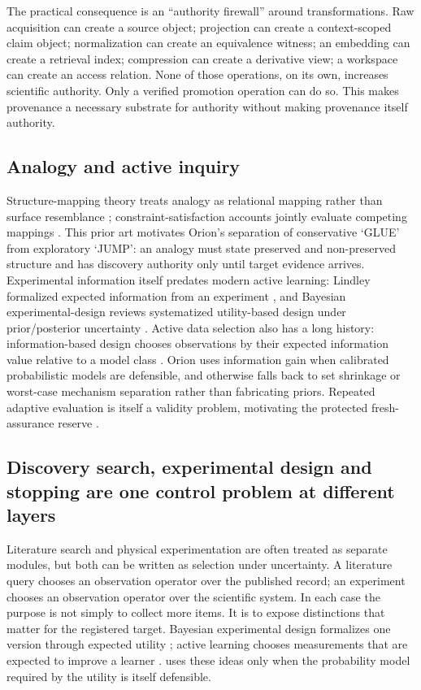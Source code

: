 The practical consequence is an ``authority firewall'' around transformations. Raw acquisition can create a source object; projection can create a context-scoped claim object; normalization can create an equivalence witness; an embedding can create a retrieval index; compression can create a derivative view; a workspace can create an access relation. None of those operations, on its own, increases scientific authority. Only a verified promotion operation can do so. This makes provenance a necessary substrate for authority without making provenance itself authority.

\subsection{Analogy and active inquiry}
Structure-mapping theory treats analogy as relational mapping rather than surface resemblance \cite{gentner1983}; constraint-satisfaction accounts jointly evaluate competing mappings \cite{holyoak1989}. This prior art motivates Orion's separation of conservative `GLUE' from exploratory `JUMP': an analogy must state preserved and non-preserved structure and has discovery authority only until target evidence arrives. Experimental information itself predates modern active learning: Lindley formalized expected information from an experiment \cite{lindley1956}, and Bayesian experimental-design reviews systematized utility-based design under prior/posterior uncertainty \cite{chaloner1995}. Active data selection also has a long history: information-based design chooses observations by their expected information value relative to a model class \cite{mackay1992}. Orion uses information gain when calibrated probabilistic models are defensible, and otherwise falls back to set shrinkage or worst-case mechanism separation rather than fabricating priors. Repeated adaptive evaluation is itself a validity problem, motivating the protected fresh-assurance reserve \cite{dwork2015}.

\subsection{Discovery search, experimental design and stopping are one control problem at different layers}

Literature search and physical experimentation are often treated as separate modules, but both can be written as selection under uncertainty. A literature query chooses an observation operator over the published record; an experiment chooses an observation operator over the scientific system. In each case the purpose is not simply to collect more items. It is to expose distinctions that matter for the registered target. Bayesian experimental design formalizes one version through expected utility \cite{lindley1956,chaloner1995}; active learning chooses measurements that are expected to improve a learner \cite{mackay1992}. \RAKL{} uses these ideas only when the probability model required by the utility is itself defensible.


